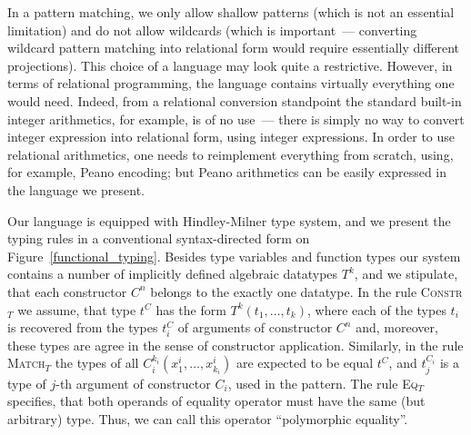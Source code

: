 In a pattern matching, we only allow shallow patterns (which is not an essential limitation) and do not allow wildcards (which is 
important~--- converting wildcard pattern matching into relational form would require essentially different projections). 
This choice of a language may 
look quite a restrictive. However, in terms of relational programming, the language contains virtually everything one would need. Indeed, from
a relational conversion standpoint the standard built-in integer arithmetics, for example, is of no use~--- 
there is simply no way to convert integer expression into relational form, using integer expressions. In order to use relational 
arithmetics, one needs to reimplement everything from scratch, using, for example, Peano encoding; but Peano arithmetics can be
easily expressed in the language we present.

Our language is equipped with Hindley-Milner type system, and we present the typing rules in a conventional syntax-directed form 
on Figure~\ref{functional_typing}. Besides type variables and function types our system contains a number of implicitly defined 
algebraic datatypes $T^k$, and we stipulate, that each constructor $C^n$ belongs to the exactly one
datatype. In the rule \textsc{Constr$_T$} we assume, that type $t^C$ has the form $T^k(t_1,\dots,t_k)$, where each of the types
$t_i$ is recovered from the types $t_i^C$ of arguments of constructor $C^n$ and, moreover, these types are agree in the sense of
constructor application. Similarly, in the rule \textsc{Match$_T$} the types of all $C_i^{k_i}(x^i_1,\dots,x^i_{k_i})$ are expected
to be equal $t^C$, and $t^{C_i}_j$ is a type of $j$-th argument of constructor $C_i$, used in the pattern. The rule \textsc{Eq$_T$}
specifies, that both operands of equality operator must have the same (but arbitrary) type. Thus, we can call this operator
``polymorphic equality''.

\setarrow{:}
\newcommand{\typed}[3]{\withenv{#1}{\trans{#2}{}{#3}}}

